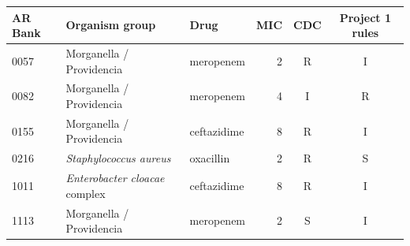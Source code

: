 \begin{tabular}{@{}lllrcc@{}}
\toprule
AR Bank & Organism group & Drug & MIC & CDC & Project 1 rules \\
\midrule
0057 & Morganella / Providencia & meropenem & 2 & R & I \\
0082 & Morganella / Providencia & meropenem & 4 & I & R \\
0155 & Morganella / Providencia & ceftazidime & 8 & R & I \\
0216 & \textit{Staphylococcus aureus} & oxacillin & 2 & R & S \\
1011 & \textit{Enterobacter cloacae} complex & ceftazidime & 8 & R & I \\
1113 & Morganella / Providencia & meropenem & 2 & S & I \\
\bottomrule
\end{tabular}
